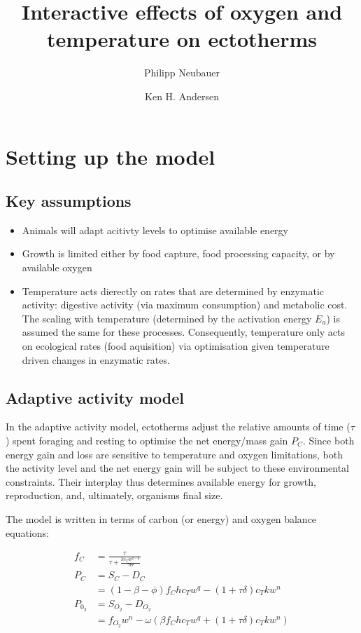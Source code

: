 \documentclass{article}
\title{Interactive effects of oxygen and temperature on ectotherms}
\author{Philipp Neubauer \and Ken H. Andersen}
\begin{document}
\maketitle

\section{Setting up the model}

\subsection{Key assumptions}
\begin{itemize}
\item Animals will adapt acitivty levels to optimise available energy
\item Growth is limited either by food capture, food processing capacity, or by available oxygen
\item Temperature acts dierectly on rates that are determined by enzymatic activity: digestive activity (via maximum consumption) and metabolic cost. The scaling with temperature (determined by the activation energy $E_a$) is assumed the same for these processes. Consequently, temperature only acts on ecological rates (food aquisition) via optimisation given temperature driven changes in enzymatic rates.


\end{itemize}

\subsection{Adaptive activity model}

In the adaptive activity model, ectotherms adjust the relative amounts of time ($\tau$) spent foraging and resting to optimise the net energy/mass gain $P_C$. Since both energy gain and loss are sensitive to temperature and oxygen limitations, both the activity level and the net energy gain will be subject to these environmental constraints. Their interplay thus determines available energy for growth, reproduction, and, ultimately, organisms final size.

The model is written in terms of carbon (or energy) and oxygen balance equations:

\begin{align}
f_C &= \frac{\tau }{\tau  + \frac{h c_T w^{q-p}}{\gamma\Theta} } \\
P_C &= S_C - D_C \\
  &=(1-\beta-\phi)f_C h c_T w^q  -(1+\tau \delta)c_T k w^n \\ 
P_{0_2} &= S_{O_2} - D_{O_2} \\
        &= f_{O_2}w^n - \omega(\beta f_C h c_T w^q +(1+\tau \delta) c_T k w^n)
\end{align}
\end{document}

